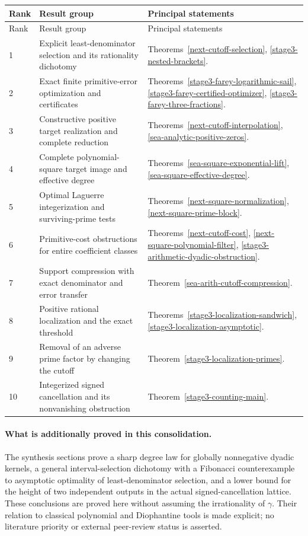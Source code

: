\documentclass[11pt,a4paper]{article}
\theoremstyle{definition}
\theoremstyle{remark}
\begin{document}
\small
\begin{longtable}{@{}p{}p{}p{}@{}}
\toprule Rank & Result group & Principal statements\\\midrule
\endfirsthead
\toprule Rank & Result group & Principal statements\\\midrule
\endhead
1 & Explicit least-denominator selection and its rationality dichotomy &
Theorems~\ref{next-cutoff-selection}, \ref{stage3-nested-brackets}.\\
2 & Exact finite primitive-error optimization and certificates &
Theorems~\ref{stage3-farey-logarithmic-sail}, \ref{stage3-farey-certified-optimizer},
\ref{stage3-farey-three-fractions}.\\
3 & Constructive positive target realization and complete reduction &
Theorems~\ref{next-cutoff-interpolation}, \ref{sea-analytic-positive-zeros}.\\
4 & Complete polynomial-square target image and effective degree &
Theorems~\ref{sea-square-exponential-lift}, \ref{sea-square-effective-degree}.\\
5 & Optimal Laguerre integerization and surviving-prime tests &
Theorems~\ref{next-square-normalization}, \ref{next-square-prime-block}.\\
6 & Primitive-cost obstructions for entire coefficient classes &
Theorems~\ref{next-cutoff-cost}, \ref{next-square-polynomial-filter},
\ref{stage3-arithmetic-dyadic-obstruction}.\\
7 & Support compression with exact denominator and error transfer &
Theorem~\ref{sea-arith-cutoff-compression}.\\
8 & Positive rational localization and the exact threshold &
Theorems~\ref{stage3-localization-sandwich}, \ref{stage3-localization-asymptotic}.\\
9 & Removal of an adverse prime factor by changing the cutoff &
Theorem~\ref{stage3-localization-primes}.\\
10 & Integerized signed cancellation and its nonvanishing obstruction &
Theorem~\ref{stage3-counting-main}.\\
\bottomrule
\end{longtable}
\normalsize

\paragraph{What is additionally proved in this consolidation.}
The synthesis sections prove a sharp degree law for globally nonnegative
dyadic kernels, a general interval-selection dichotomy with a Fibonacci
counterexample to asymptotic optimality of least-denominator selection,
and a lower bound for the height of two independent outputs in the
actual signed-cancellation lattice. These conclusions are proved here
without assuming the irrationality of \(\gamma\). Their relation to
classical polynomial and Diophantine tools is made explicit; no literature
priority or external peer-review status is asserted.
\end{document}
